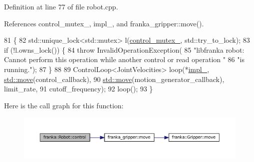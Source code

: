 Definition at line 77 of file robot.\+cpp.



References control\+\_\+mutex\+\_\+, impl\+\_\+, and franka\+\_\+gripper\+::move().


\begin{DoxyCode}
81                              \{
82   std::unique\_lock<std::mutex> l(\hyperlink{classfranka_1_1Robot_a719ad1fab76f8edfc9f6f761671c1375}{control\_mutex\_}, std::try\_to\_lock);
83   \textcolor{keywordflow}{if} (!l.owns\_lock()) \{
84     \textcolor{keywordflow}{throw} InvalidOperationException(
85         \textcolor{stringliteral}{"libfranka robot: Cannot perform this operation while another control or read operation "}
86         \textcolor{stringliteral}{"is running."});
87   \}
88 
89   ControlLoop<JointVelocities> loop(*\hyperlink{classfranka_1_1Robot_aca155054184e5b6478942fd6a1b82ba4}{impl\_}, \hyperlink{namespacefranka__gripper_a1356a87108d2229401d3755bd3e53bdf}{std::move}(control\_callback),
90                                     \hyperlink{namespacefranka__gripper_a1356a87108d2229401d3755bd3e53bdf}{std::move}(motion\_generator\_callback), limit\_rate,
91                                     cutoff\_frequency);
92   loop();
93 \}
\end{DoxyCode}
Here is the call graph for this function\+:
\nopagebreak
\begin{figure}[H]
\begin{center}
\leavevmode
\includegraphics[width=350pt]{classfranka_1_1Robot_ab16874af2fa32c9ab901683c1666888b_cgraph}
\end{center}
\end{figure}
\mbox{\label{classfranka_1_1Robot_a368c282fca42f4214864d0d39893fc6e}} 
